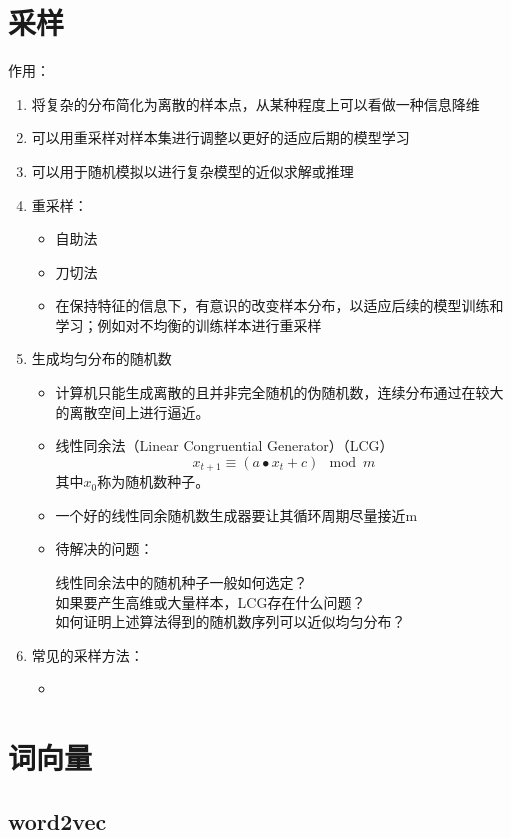 \documentclass[UTF8]{article}%
\begin{document}
	\section{采样}
		作用：
		\begin{enumerate}
			\item 将复杂的分布简化为离散的样本点，从某种程度上可以看做一种信息降维
			\item 可以用重采样对样本集进行调整以更好的适应后期的模型学习
			\item 可以用于随机模拟以进行复杂模型的近似求解或推理
			\item 重采样：
				\begin{itemize}
					\item 自助法
					\item 刀切法
					\item 在保持特征的信息下，有意识的改变样本分布，以适应后续的模型训练和学习；例如对不均衡的训练样本进行重采样
				\end{itemize}
			\item 生成均匀分布的随机数
				\begin{itemize}
					\item 计算机只能生成离散的且并非完全随机的伪随机数，连续分布通过在较大的离散空间上进行逼近。
					\item 线性同余法（Linear Congruential Generator）（LCG）$$x_{t+1}\equiv (a \bullet x_t +c)\mod m$$其中$x_0$称为随机数种子。
					\item 一个好的线性同余随机数生成器要让其循环周期尽量接近m
					\item 待解决的问题：
					\begin{description}
						\item[线性同余法中的随机种子一般如何选定？]
						\item[如果要产生高维或大量样本，LCG存在什么问题？]
						\item[如何证明上述算法得到的随机数序列可以近似均匀分布？]  
					\end{description}
				\end{itemize}
			\item 常见的采样方法：
			\begin{itemize}
				\item 
			\end{itemize}	
		\end{enumerate}
	\newpage
	\section{词向量}
		\subsection{word2vec}
\end{document}
